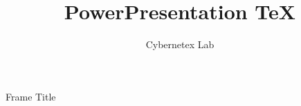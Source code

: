 \documentclass{beamer}
\title{PowerPresentation \TeX}
\author{Cybernetex Lab}
\begin{document}
\begin{frame}[plain]
    \maketitle
\end{frame}

\begin{frame}{Frame Title}
\end{frame}
\end{document}
